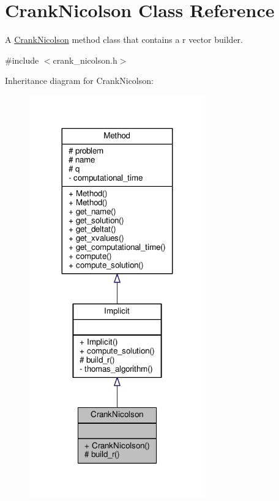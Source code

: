 \hypertarget{classCrankNicolson}{}\section{Crank\+Nicolson Class Reference}
\label{classCrankNicolson}


A \hyperlink{classCrankNicolson}{Crank\+Nicolson} method class that contains a r vector builder.  




{\ttfamily \#include $<$crank\+\_\+nicolson.\+h$>$}



Inheritance diagram for Crank\+Nicolson\+:
\nopagebreak
\begin{figure}[H]
\begin{center}
\leavevmode
\includegraphics[width=215pt]{classCrankNicolson__inherit__graph}
\end{center}
\end{figure}


